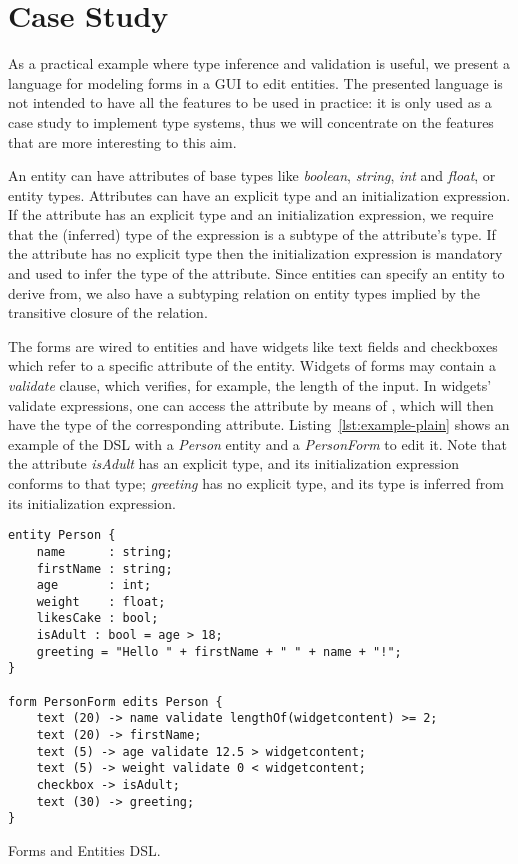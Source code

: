 \section{Case Study}
\label{sec:casestudy}

As a practical example where type inference and validation is useful, we present
a language for modeling forms in a GUI to edit entities.  The
presented language is not intended to have all the features to be used in
practice: it is only used as a case study to implement type systems, thus we
will concentrate on the features that are more interesting to this aim.

An entity can have attributes of base types like \emph{boolean}, \emph{string},
\emph{int} and \emph{float}, or entity types.
Attributes can have an explicit type and an initialization expression.
If the attribute has an explicit type and an initialization expression, we
require that the (inferred) type of the expression is a subtype of the
attribute's type. If the attribute has no explicit type then the initialization
expression is mandatory and used to infer the type of the attribute.
Since entities can specify an entity to derive from, we also have a subtyping
relation on entity types implied by the transitive closure of the
 relation.

The forms are wired to entities and have widgets like text fields and
checkboxes which refer to a specific attribute of the entity.
Widgets of forms may contain a \emph{validate} clause, which verifies, for
example, the length of the input.
In widgets' validate expressions, one can access the attribute by means of
, which will then have the type of the corresponding
attribute.  Listing~\ref{lst:example-plain} shows an example of the DSL with a
\emph{Person} entity and a \emph{PersonForm} to edit it. Note that the attribute
\emph{isAdult} has an explicit type, and its initialization expression
conforms to that type; \emph{greeting} has no explicit type, and its type is
inferred from its initialization expression.

%

\begin{listing}[tb]
\begin{multicols}{2}
\begin{lstlisting}[language=guidsl] 
entity Person {
	name      : string;
	firstName : string;
	age       : int; 
	weight    : float;
	likesCake : bool; 
	isAdult : bool = age > 18;
	greeting = "Hello " + firstName + " " + name + "!";
}

form PersonForm edits Person {
	text (20) -> name validate lengthOf(widgetcontent) >= 2;
	text (20) -> firstName;
	text (5) -> age validate 12.5 > widgetcontent;
	text (5) -> weight validate 0 < widgetcontent;
	checkbox -> isAdult;
	text (30) -> greeting;
}
\end{lstlisting}
\end{multicols}
\vspace{-3.5ex}
\caption{Forms and Entities DSL.}
\label{lst:example-plain}
\end{listing}

